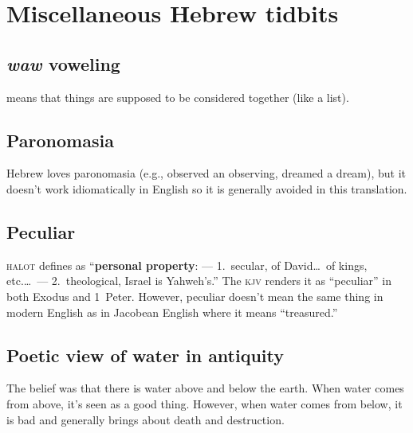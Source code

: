 \section{Miscellaneous Hebrew tidbits}\label{app:misc-heb}
\subsection{\textit{waw} voweling}\label{app:waw-voweling}
 means that things are supposed to be considered together (like a list).

\subsection{Paronomasia}\label{app:paronomasia}
Hebrew loves paronomasia (e.g., observed an observing, dreamed a dream), but it doesn't work idiomatically in English so it is generally avoided in this translation.

\subsection{Peculiar}\label{app:peculiar}
\textsc{halot} defines  as ``\textbf{personal property}: --- 1.\ secular, of David\dots\ of kings, etc.\dots\ --- 2.\ theological, Israel is Yahweh's.'' The \textsc{kjv} renders it as ``peculiar'' in both Exodus and 1~Peter. However, peculiar doesn't mean the same thing in modern English as in Jacobean English where it means ``treasured.''

\subsection{Poetic view of water in antiquity}\label{app:water-in-antiquity}
The belief was that there is water above and below the earth. When water comes from above, it's seen as a good thing. However, when water comes from below, it is bad and generally brings about death and destruction.
